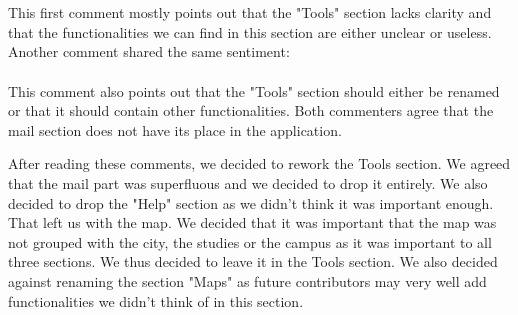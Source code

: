 \documentclass{eplmastersthesis}
\begin{document}
\\\\

This first comment mostly points out that the "Tools" section lacks clarity and that the functionalities we can find in this section are either unclear or useless. Another comment shared the same sentiment:\\

 \\

This comment also points out that the "Tools" section should either be renamed or that it should contain other functionalities. Both commenters agree that the mail section does not have its place in the application.\\

\newpage

After reading these comments, we decided to rework the Tools section. We agreed that the mail part was superfluous and we decided to drop it entirely. We also decided to drop the "Help" section as we didn't think it was important enough. That left us with the map. We decided that it was important that the map was not grouped with the city, the studies or the campus as it was important to all three sections. We thus decided to leave it in the Tools section. We also decided against renaming the section "Maps" as future contributors may very well add functionalities we didn't think of in this section.
\end{document}

